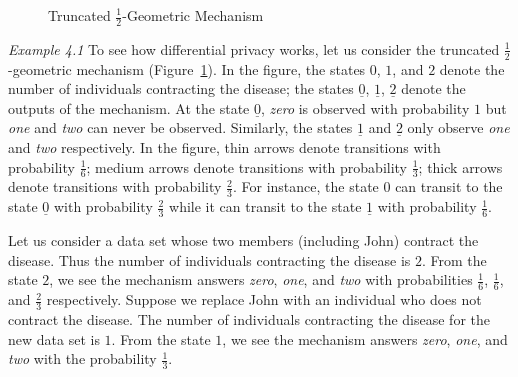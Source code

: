 \begin{figure}
{
    }
  \caption{Truncated $\frac{1}{2}$-Geometric Mechanism}
  \label{figure:geometric-mechanism}
\end{figure}

\noindent
\textit{Example 4.1}
To see how differential privacy works, let us consider the truncated
$\frac{1}{2}$-geometric mechanism
(Figure~\ref{figure:geometric-mechanism}).
In the figure, the states $0$, $1$, and $2$ denote the number of
individuals contracting the disease; the states $\underline{0}$,
$\underline{1}$, $\underline{2}$ denote the outputs of the
mechanism. At the state $\underline{0}$, \textit{zero} is observed
with probability $1$ but \textit{one} and \textit{two} can never be
observed. Similarly, the states $\underline{1}$ and $\underline{2}$
only observe \textit{one} and \textit{two} respectively.
In the figure, thin arrows denote transitions with probability
$\frac{1}{6}$; medium arrows denote transitions with probability
$\frac{1}{3}$; thick arrows denote transitions with probability
$\frac{2}{3}$. For instance, the state $0$ can transit to the state
$\underline{0}$ with probability $\frac{2}{3}$ while it can transit to
the state $\underline{1}$ with probability $\frac{1}{6}$.

Let us consider a data set whose two members (including John) contract
the disease. Thus the number of individuals contracting the disease is
$2$. From the state $2$, we see the mechanism answers
\textit{zero}, \textit{one}, and \textit{two} with probabilities
$\frac{1}{6}$, $\frac{1}{6}$, and $\frac{2}{3}$ respectively.
Suppose we replace John with an individual who does not contract
the disease. The number of individuals contracting the disease for the
new data set is $1$. From the state $1$, we see the mechanism answers
\textit{zero}, \textit{one}, and \textit{two} with the probability
$\frac{1}{3}$.


